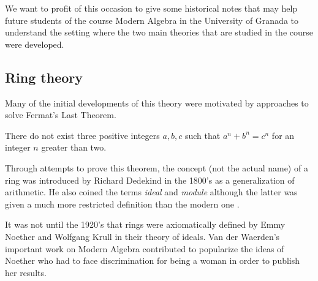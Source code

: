 We want to profit of this occasion to give some historical notes that may help future students of the course Modern Algebra in the University of Granada to understand the setting where the two main theories that are studied in the course were developed. 

\subsection{Ring theory}

Many of the initial developments of this theory were motivated by approaches to solve Fermat's Last Theorem. 

\begin{theorem}
There do not exist three positive integers $a,b,c$ such
that $a^n+b^n=c^n$ for  an  integer $n$ greater  than  two.
\end{theorem}

Through  attempts  to  prove  this theorem,  the  concept (not the actual name)  of  a  ring  was  introduced  by  Richard  Dedekind  in  the  1800's  as  a  generalization  of  arithmetic. He also coined the terms \textit{ideal} and \textit{module} although the latter was given a much more restricted definition than the modern one \cite{ring}.

It  was  not  until  the  1920's  that  rings
were axiomatically defined by Emmy Noether and Wolfgang Krull in their theory of ideals. Van der Waerden's important work on Modern Algebra contributed to popularize the ideas of Noether who had to face discrimination for being a woman in order to publish her results. 

